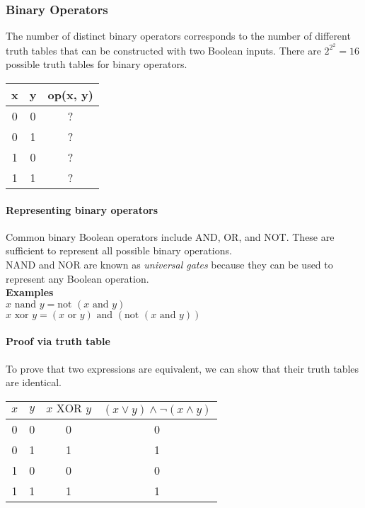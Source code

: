 \documentclass[12pt]{article}
\begin{document}
\vspace{1em}

\subsubsection{Binary Operators}
The number of distinct binary operators corresponds to the number of different truth tables that can be constructed with two Boolean inputs. There are $2^{2^2} = 16$ possible truth tables for binary operators.

\begin{tabular}{c c c}
x & y & op(x, y) \\
\hline
0 & 0 & ? \\
0 & 1 & ? \\
1 & 0 & ? \\
1 & 1 & ? \\
\end{tabular}

\paragraph{Representing binary operators}
Common binary Boolean operators include AND, OR, and NOT. These are sufficient to represent all possible binary operations.\\
NAND and NOR are known as \textit{universal gates} because they can be used to represent any Boolean operation.\\

\textbf{Examples}\\
$x \text{ nand } y = \text{not } (x \text{ and } y)$ \\
$x \text{ xor } y = (x \text{ or } y) \text{ and } (\text{not } (x \text{ and } y))$ 

\paragraph{Proof via truth table}
To prove that two expressions are equivalent, we can show that their truth tables are identical.

\begin{center}
\begin{tabular}{cc|c|c}
$x$ & $y$ & $x \text{ XOR } y$ & $(x \lor y) \land \lnot(x \land y)$ \\
\hline
0 & 0 & 0 & 0 \\
0 & 1 & 1 & 1 \\
1 & 0 & 0 & 0 \\
1 & 1 & 1 & 1 \\
\end{tabular}
\end{center}
\end{document}
